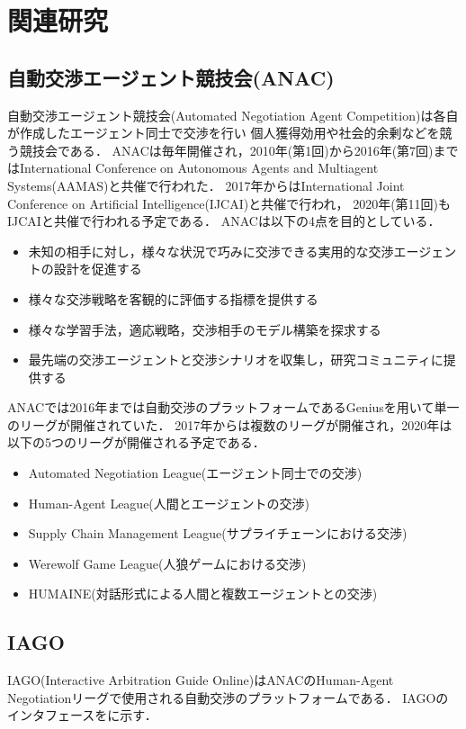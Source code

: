 

\chapter{関連研究}
\label{chap:related}
\section{自動交渉エージェント競技会(ANAC)}

自動交渉エージェント競技会(Automated Negotiation Agent Competition)は各自が作成したエージェント同士で交渉を行い
個人獲得効用や社会的余剰などを競う競技会である\cite{anac2010-2017,anac2018,anac2019,anac2020}．
ANACは毎年開催され，2010年(第1回)から2016年(第7回)まではInternational Conference on Autonomous Agents and Multiagent Systems(AAMAS)と共催で行われた．
2017年からはInternational Joint Conference on Artificial Intelligence(IJCAI)と共催で行われ，
2020年(第11回)もIJCAIと共催で行われる予定である．
ANACは以下の4点を目的としている．

\begin{itemize}
    \item 未知の相手に対し，様々な状況で巧みに交渉できる実用的な交渉エージェントの設計を促進する
    \item 様々な交渉戦略を客観的に評価する指標を提供する
    \item 様々な学習手法，適応戦略，交渉相手のモデル構築を探求する
    \item 最先端の交渉エージェントと交渉シナリオを収集し，研究コミュニティに提供する
\end{itemize}

ANACでは2016年までは自動交渉のプラットフォームであるGeniusを用いて単一のリーグが開催されていた．
2017年からは複数のリーグが開催され，2020年は以下の5つのリーグが開催される予定である．

\begin{itemize}
    \item Automated Negotiation League(エージェント同士での交渉)
    \item Human-Agent League(人間とエージェントの交渉)
    \item Supply Chain Management League(サプライチェーンにおける交渉)
    \item Werewolf Game League(人狼ゲームにおける交渉)
    \item HUMAINE(対話形式による人間と複数エージェントとの交渉)
\end{itemize}

\section{IAGO}
IAGO(Interactive Arbitration Guide Online)はANACのHuman-Agent Negotiationリーグで使用される自動交渉のプラットフォームである\cite{iago}．
IAGOのインタフェースをに示す．


